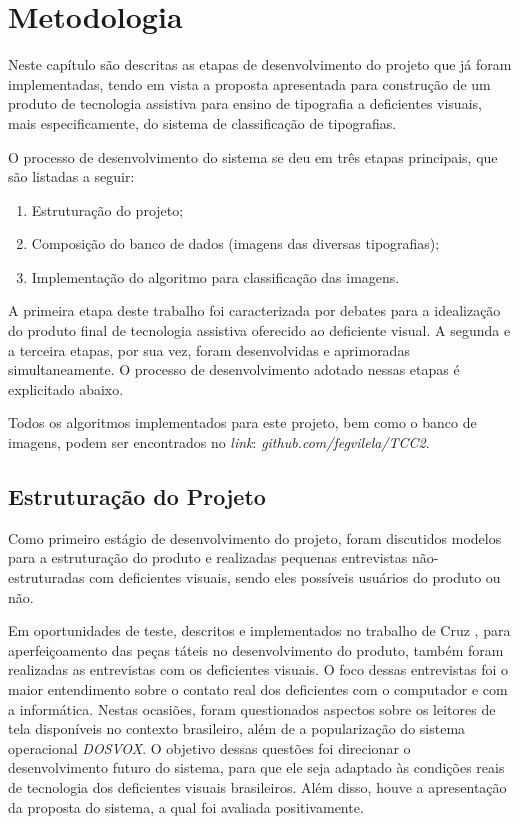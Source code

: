 

\chapter{Metodologia}
\label{ch:Metodologia}

Neste capítulo são descritas as etapas de desenvolvimento do projeto que já foram implementadas, tendo em vista a proposta apresentada para construção de um produto de tecnologia assistiva para ensino de tipografia a deficientes visuais, mais especificamente, do sistema de classificação de tipografias.

O processo de desenvolvimento do sistema se deu em três etapas principais, que são listadas a seguir:

\begin{enumerate}
\item Estruturação do projeto;
\item Composição do banco de dados (imagens das diversas tipografias);
\item Implementação do algoritmo para classificação das imagens.
\end{enumerate}

A primeira etapa deste trabalho foi caracterizada por debates para a idealização do produto final de tecnologia assistiva oferecido ao deficiente visual. A segunda e a terceira etapas, por sua vez, foram desenvolvidas e aprimoradas simultaneamente. O processo de desenvolvimento adotado nessas etapas é explicitado abaixo.

Todos os algoritmos implementados para este projeto, bem como o banco de imagens, podem ser encontrados no \textit{link}: \textit{github.com/fegvilela/TCC2}.

\section{Estruturação do Projeto}

Como primeiro estágio de desenvolvimento do projeto, foram discutidos modelos para a estruturação do produto e realizadas pequenas entrevistas não-estruturadas com deficientes visuais, sendo eles possíveis usuários do produto ou não.

Em oportunidades de teste, descritos e implementados no trabalho de Cruz , para aperfeiçoamento das peças táteis no desenvolvimento do produto, também foram realizadas as entrevistas com os deficientes visuais. O foco dessas entrevistas foi o maior entendimento sobre o contato real dos deficientes com o computador e com a informática. Nestas ocasiões, foram questionados aspectos sobre os leitores de tela disponíveis no contexto brasileiro, além de a popularização do sistema operacional \textit{DOSVOX}. O objetivo dessas questões foi direcionar o desenvolvimento futuro do sistema, para que ele seja adaptado às condições reais de tecnologia dos deficientes visuais brasileiros. Além disso, houve a apresentação da proposta do sistema, a qual foi avaliada positivamente.

